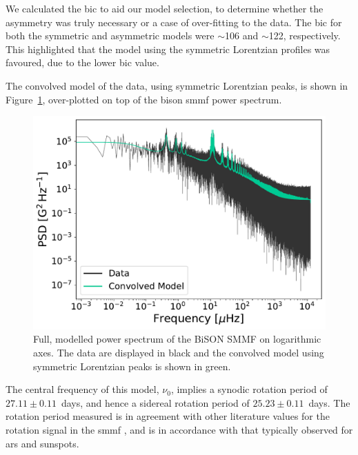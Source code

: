 We calculated the \gls{bic} to aid our model selection, to determine whether the asymmetry was truly necessary or a case of over-fitting to the data. The \gls{bic} for both the symmetric and asymmetric models were $\sim$106 and $\sim$122, respectively. This highlighted that the model using the symmetric Lorentzian profiles was favoured, due to the lower \gls{bic} value. 

The convolved model of the data, using symmetric Lorentzian peaks, is shown in Figure~\ref{fig:BiSON_PSD_fit}, over-plotted on top of the \gls{bison} \gls{smmf} power spectrum.


\begin{figure}[ht!]
	\centering
	\includegraphics[width=\columnwidth]{BiSON_PSD_model.pdf}
	\caption{Full, modelled power spectrum of the BiSON SMMF on logarithmic axes. The data are displayed in black and the convolved model using symmetric Lorentzian peaks is shown in green.}
	\label{fig:BiSON_PSD_fit}
\end{figure}


The central frequency of this model, $\nu_0$, implies a synodic rotation period of $27.11\pm0.11$~days, and hence a sidereal rotation period of $25.23\pm0.11$~days. The rotation period measured is in agreement with other literature values for the rotation signal in the \gls{smmf} \citep{chaplin_studies_2003, xie_temporal_2017}, and is in accordance with that typically observed for \glspl{ar} and sunspots.


